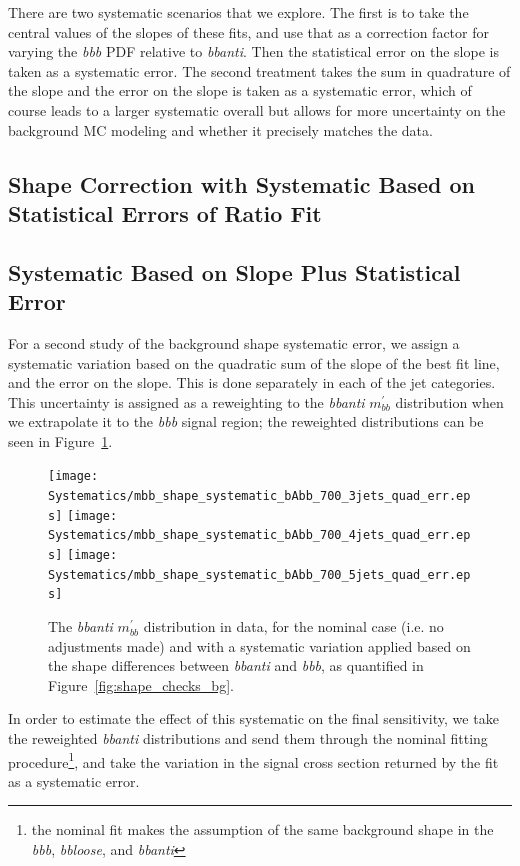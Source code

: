 There are two systematic scenarios that we explore.  The first is to take the central values of the
slopes of these fits, and use that as a correction factor for varying the \textit{bbb} PDF
relative to \textit{bbanti}.  Then the statistical error on the slope is taken as a systematic error.
The second treatment takes the sum in quadrature of the slope and the error on the slope is
taken as a systematic error, which of course leads to a larger systematic overall but allows for
more uncertainty on the background MC modeling and whether it precisely matches the data.


\subsection{Shape Correction with Systematic Based on Statistical Errors of Ratio Fit}

\subsection{Systematic Based on Slope Plus Statistical Error}
For a second study of the background shape systematic error, 
we assign a systematic variation based on the quadratic sum of the slope of the best
fit line, and the error on the slope. This is done separately in each of the jet categories.
This uncertainty is assigned as a reweighting to the \textit{bbanti} $m^{'}_{bb}$ distribution
when we extrapolate it to the \textit{bbb} signal region; the reweighted distributions can be
seen in Figure~\ref{fig:shape_error_bg}.
\begin{figure}
    \center
  \texttt{[image: Systematics/mbb\_shape\_systematic\_bAbb\_700\_3jets\_quad\_err.eps]}
  \texttt{[image: Systematics/mbb\_shape\_systematic\_bAbb\_700\_4jets\_quad\_err.eps]}
  \texttt{[image: Systematics/mbb\_shape\_systematic\_bAbb\_700\_5jets\_quad\_err.eps]}
  \caption{The \textit{bbanti} $m^{'}_{bb}$ distribution in data, for the nominal case (i.e. no 
  adjustments made) and with a systematic variation applied based on the shape differences between \textit{bbanti}
  and \textit{bbb}, as quantified in Figure~\ref{fig:shape_checks_bg}.\label{fig:shape_error_bg}}
\end{figure}                                                                                                                        
 
In order to estimate the effect of this systematic on the final sensitivity, we take the
reweighted \textit{bbanti} distributions and send them through the nominal fitting procedure\footnote{the 
nominal fit makes the assumption of the same background shape in the \textit{bbb}, \textit{bbloose},
and \textit{bbanti}}, 
and take the variation in the signal cross section returned by the fit as a systematic error.

